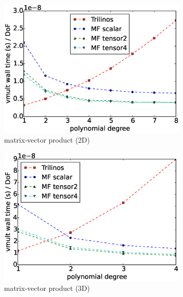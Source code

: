 \documentclass[times,doublespace]{nmeauth}
\begin{document}
\begin{figure}[!ht]
  \centering
  \begin{subfigure}[b]{0.49\textwidth}
      \centering
      \includegraphics[width=\textwidth]{Emmy_RRZE_timing2d.eps}
      \caption{matrix-vector product (2D)}
      \label{fig:benchmark_miehe_Emmy_vmult2}
  \end{subfigure}
  \begin{subfigure}[b]{0.49\textwidth}
    \centering
    \includegraphics[width=\textwidth]{Emmy_RRZE_timing3d.eps}
    \caption{matrix-vector product (3D)}
    \label{fig:benchmark_miehe_Emmy_vmult3}
  \end{subfigure}
  ~
  \begin{subfigure}[b]{0.49\textwidth}
      \centering

\end{subfigure}
\end{figure}
\end{document}
